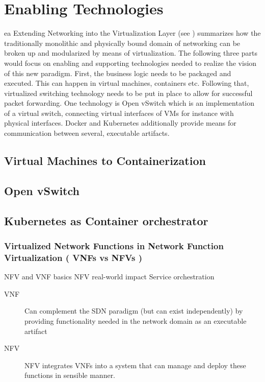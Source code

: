 



\section{Enabling Technologies}ea
Extending Networking into the Virtualization Layer (see \cite{pfaff2009extending}) summarizes how the traditionally monolithic and physically bound domain of networking can be broken up and modularized by means of virtualization. The following three parts would focus on enabling and supporting technologies needed to realize the vision of this new paradigm. First, the business logic needs to be packaged and executed. This can happen in virtual machines, containers etc. Following that, virtualized switching technology needs to be put in place to allow for successful packet forwarding. One technology is Open vSwitch which is an implementation of a virtual switch, connecting virtual interfaces of VMs for instance with physical interfaces. Docker and Kubernetes additionally provide means for communication between several, executable artifacts.
\subsection{Virtual Machines to Containerization}
\subsection{Open vSwitch}
\subsection{Kubernetes as Container orchestrator}

\quad


\subsubsection{Virtualized Network Functions in Network Function Virtualization ( VNFs vs NFVs )}
NFV and VNF basics \cite{mijumbi2016network} NFV real-world impact \cite{bilal2016impact} Service orchestration \cite{de2018network}

\begin{description}
	\item [VNF] Can complement the SDN paradigm (but can exist independently)  by providing functionality needed in the network domain as an executable artifact
	\item [NFV] NFV integrates VNFs into a system that can manage and deploy these functions in sensible manner. 
\end{description}
